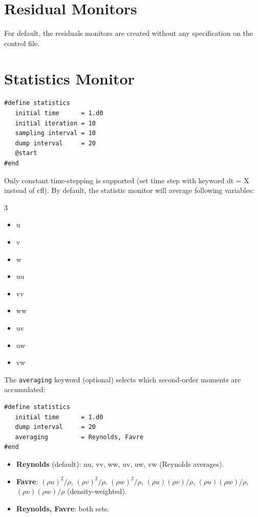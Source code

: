 \documentclass[a4paper,10pt]{report}
\begin{document}
\section{Residual Monitors}
For default, the residuals monitors are created without any specification on the control file.

\section{Statistics Monitor}
\begin{lstlisting}
#define statistics
   initial time      = 1.d0
   initial iteration = 10
   sampling interval = 10
   dump interval     = 20
   @start
#end
\end{lstlisting}

Only constant time-stepping is supported (set time step with keyword dt = X instead of cfl).
By default, the statistic monitor will average following variables:

\begin{multicols}{3}
\begin{itemize}
\item u
\item v
\item w
\item uu 
\item vv 
\item ww 
\item uv 
\item uw 
\item vw 
\end{itemize}
\end{multicols}

The \texttt{averaging} keyword (optional) selects which second-order moments are accumulated:

\begin{lstlisting}
#define statistics
   initial time      = 1.d0
   dump interval     = 20
   averaging         = Reynolds, Favre
#end
\end{lstlisting}

\begin{itemize}
\item \textbf{Reynolds} (default): uu, vv, ww, uv, uw, vw (Reynolds averages).
\item \textbf{Favre}: $(\rho u)^2/\rho$, $(\rho v)^2/\rho$, $(\rho w)^2/\rho$, $(\rho u)(\rho v)/\rho$, $(\rho u)(\rho w)/\rho$, $(\rho v)(\rho w)/\rho$ (density-weighted).
\item \textbf{Reynolds, Favre}: both sets.
\end{itemize}
\end{document}
